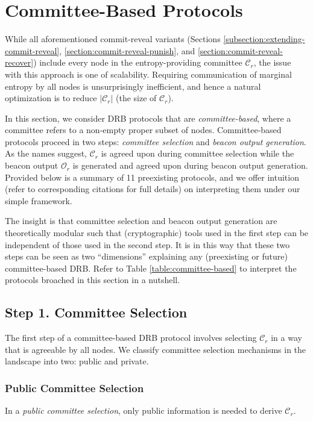\documentclass[letterpaper,twocolumn,10pt]{article}
\theoremstyle{definition}
\theoremstyle{remark}
\begin{document}
\section{Committee-Based Protocols}
\label{section:committee-based}
While all aforementioned commit-reveal variants (Sections \ref{subsection:extending-commit-reveal}, \ref{section:commit-reveal-punish}, and \ref{section:commit-reveal-recover}) include every node in the entropy-providing committee $\mathcal{C}_r$, the issue with this approach is one of scalability. Requiring communication of marginal entropy by all nodes is unsurprisingly inefficient, and hence a natural optimization is to reduce $|\mathcal{C}_r|$ (the size of $\mathcal{C}_r$).

In this section, we consider DRB protocols that are \textit{committee-based}, where a committee refers to a non-empty proper subset of nodes. Committee-based protocols proceed in two steps: \textit{committee selection} and \textit{beacon output generation}. As the names suggest, $\mathcal{C}_r$ is agreed upon during committee selection while the beacon output $\mathcal{O}_r$ is generated and agreed upon during beacon output generation. Provided below is a summary of 11 preexisting protocols, and we offer intuition (refer to corresponding citations for full details) on interpreting them under our simple framework.

The insight is that committee selection and beacon output generation are theoretically modular such that (cryptographic) tools used in the first step can be independent of those used in the second step. It is in this way that these two steps can be seen as two ``dimensions'' explaining any (preexisting or future) committee-based DRB. Refer to Table \ref{table:committee-based} to interpret the protocols broached in this section in a nutshell.

\subsection{Step 1. Committee Selection}
The first step of a committee-based DRB protocol involves selecting $\mathcal{C}_r$ in a way that is agreeable by all nodes. We classify committee selection mechanisms in the landscape into two: public and private.

\subsubsection{Public Committee Selection}
\label{subsubsection:public-committee-selection}
In a \textit{public committee selection}, only public information is needed to derive $\mathcal{C}_r$.\\
\end{document}
